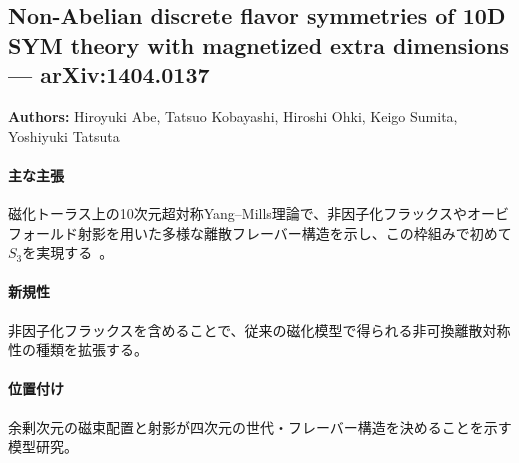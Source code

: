 \subsection{Non-Abelian discrete flavor symmetries of 10D SYM theory with magnetized extra dimensions --- arXiv:1404.0137}

\textbf{Authors:} Hiroyuki Abe, Tatsuo Kobayashi, Hiroshi Ohki, Keigo Sumita, Yoshiyuki Tatsuta

\paragraph{主な主張}
磁化トーラス上の10次元超対称Yang--Mills理論で、非因子化フラックスやオービフォールド射影を用いた多様な離散フレーバー構造を示し、この枠組みで初めて$S_3$を実現する~\cite{Abe:2014nla}。

\paragraph{新規性}
非因子化フラックスを含めることで、従来の磁化模型で得られる非可換離散対称性の種類を拡張する。

\paragraph{位置付け}
余剰次元の磁束配置と射影が四次元の世代・フレーバー構造を決めることを示す模型研究。
